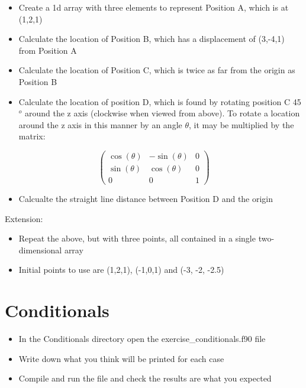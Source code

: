 \documentclass[11pt,a4paper]{article}
\begin{document}
\begin{itemize}
    \item Create a 1d array with three elements to represent Position A, which is at (1,2,1)
    \item Calculate the location of Position B, which has a displacement of (3,-4,1) from Position A
    \item Calculate the location of Position C, which is twice as far from the origin as Position B
    \item Calculate the location of position D, which is found by rotating position C 45$^{o}$ around the z axis (clockwise when viewed from above). To rotate a location around the z axis in this manner by an angle $\theta$, it may be multiplied by the matrix:
\end{itemize}

\begin{equation}
\begin{pmatrix}
\cos{(\theta)} & -\sin{(\theta)} & 0\\
\sin{(\theta)} & \cos{(\theta)} & 0 \\
0 & 0 & 1
\end{pmatrix}
\end{equation}

\begin{itemize}
    \item Calcualte the straight line distance between Position D and the origin
\end{itemize}

Extension:
\begin{itemize}
    \item Repeat the above, but with three points, all contained in a single two-dimensional array
    \item Initial points to use are (1,2,1), (-1,0,1) and (-3, -2, -2.5)
\end{itemize}

\section{Conditionals}
\begin{itemize}
    \item In the Conditionals directory open the exercise\_conditionals.f90 file
    \item Write down what you think will be printed for each case
    \item Compile and run the file and check the results are what you expected
\end{itemize}
\end{document}
